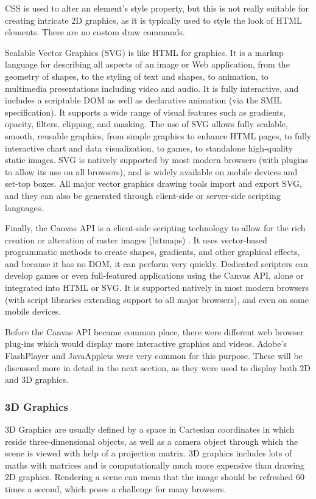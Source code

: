 \documentclass[a4paper,11pt,titlepage]{article}
\begin{document}
CSS is used to alter an element's style property, but this is not really suitable for creating intricate 2D graphics, as it is typically used to style the look of HTML elements. There are no custom draw commands.

Scalable Vector Graphics (SVG) is like HTML for graphics. It is a markup language for describing all aspects of an image or Web application, from the geometry of shapes, to the styling of text and shapes, to animation, to multimedia presentations including video and audio. It is fully interactive, and includes a scriptable DOM as well as declarative animation (via the SMIL specification). It supports a wide range of visual features such as gradients, opacity, filters, clipping, and masking.
The use of SVG allows fully scalable, smooth, reusable graphics, from simple graphics to enhance HTML pages, to fully interactive chart and data visualization, to games, to standalone high-quality static images. SVG is natively supported by most modern browsers (with plugins to allow its use on all browsers), and is widely available on mobile devices and set-top boxes. All major vector graphics drawing tools import and export SVG, and they can also be generated through client-side or server-side scripting languages.

Finally, the Canvas API is a client-side scripting technology to allow for the rich creation or alteration of raster images (bitmaps) . It uses vector-based programmatic methods to create shapes, gradients, and other graphical effects, and because it has no DOM, it can perform very quickly. Dedicated scripters can develop games or even full-featured applications using the Canvas API, alone or integrated into HTML or SVG. It is supported natively in most modern browsers (with script libraries extending support to all major browsers), and even on some mobile devices.

Before the Canvas API became common place, there were different web browser plug-ins which would display more interactive graphics and videos. Adobe's FlashPlayer and JavaApplets were very common for this purpose. These will be discussed more in detail in the next section, as they were used to display both 2D and 3D graphics.

\subsubsection{3D Graphics}

3D Graphics are usually defined by a space in Cartesian coordinates in which reside three-dimensional objects, as well as a camera object through which the scene is viewed with help of a projection matrix. 3D graphics includes lots of maths with matrices and is computationally much more expensive than drawing 2D graphics. Rendering a scene can mean that the image should be refreshed 60 times a second, which poses a challenge for many browsers.
\end{document}
